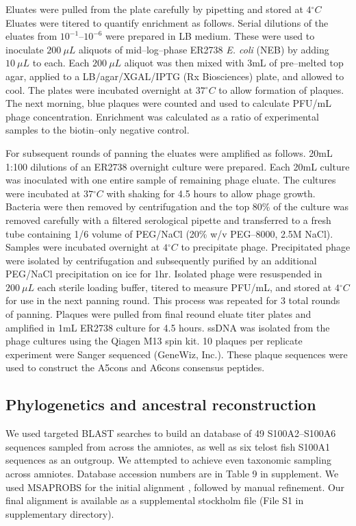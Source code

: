 Eluates were pulled from the plate carefully by pipetting and stored
at $4{^\circ}C$ Eluates were titered to quantify enrichment as follows.
Serial dilutions of the eluates from $10^{-1}$--$10^{-6}$ were prepared
in LB medium. These were used to inoculate $200\ \mu L$ aliquots
of mid--log--phase ER2738 \textit{E. coli} (NEB) by adding $10\ \mu L$
to each. Each $200\ \mu L$ aliquot was then mixed with 3mL of pre--melted
top agar, applied to a LB/agar/XGAL/IPTG (Rx Biosciences) plate, and
allowed to cool. The plates were incubated overnight at $37{^\circ}C$
to allow formation of plaques. The next morning, blue plaques were
counted and used to calculate PFU/mL phage concentration. Enrichment
was calculated as a ratio of experimental samples to the biotin--only
negative control. 

For subsequent rounds of panning the eluates were amplified as follows.
20mL 1:100 dilutions of an ER2738 overnight culture were prepared.
Each 20mL culture was inoculated with one entire sample of remaining
phage eluate. The cultures were incubated at $37{^\circ}C$ with shaking
for 4.5 hours to allow phage growth. Bacteria were then removed by
centrifugation and the top 80\% of the culture was removed carefully
with a filtered serological pipette and transferred to a fresh tube
containing 1/6 volume of PEG/NaCl (20\% w/v PEG--8000, 2.5M NaCl).
Samples were incubated overnight at $4{^\circ}C$ to precipitate phage.
Precipitated phage were isolated by centrifugation and subsequently
purified by an additional PEG/NaCl precipitation on ice for 1hr. Isolated
phage were resuspended in $200\ \mu L$ each sterile loading buffer,
titered to measure PFU/mL, and stored at $4{^\circ}C$ for use in
the next panning round. This process was repeated for 3 total rounds
of panning. Plaques were pulled from final reound eluate titer plates
and amplified in 1mL ER2738 culture for 4.5 hours. ssDNA was isolated
from the phage cultures using the Qiagen M13 spin kit. 10 plaques
per replicate experiment were Sanger sequenced (GeneWiz, Inc.). These
plaque sequences were used to construct the A5cons and A6cons consensus
peptides. 

\subsection{Phylogenetics and ancestral reconstruction}

We used targeted BLAST searches to build an database of 49 S100A2--S100A6
sequences sampled from across the amniotes, as well as six telost
fish S100A1 sequences as an outgroup. We attempted to achieve even
taxonomic sampling across amniotes. Database accession numbers are
in Table 9 in supplement. We used MSAPROBS for the initial alignment \citep{liu_msaprobs:_2010},
followed by manual refinement. Our final alignment is available as
a supplemental stockholm file (File S1 in supplementary directory). 

